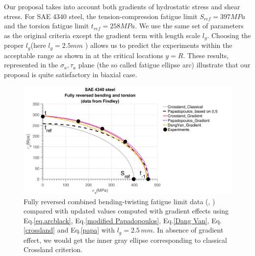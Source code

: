 Our proposal takes into account both gradients of hydrostatic stress and shear stress. For SAE 4340 steel, the tension-compression fatigue limit $S_{ref}=397MPa$ and the torsion fatigue limit $t_{ref}=258MPa$. We use the same set of parameters as the original criteria except the gradient term with length scale $l_g$. Choosing the proper $l_g$(here $l_g=2.5mm$ ) allows us to predict the experiments within the acceptable range as shown in  at the critical locations $y=R$. These results, represented in the $\sigma_a, \tau_a$ plane (the so called fatigue ellipse arc)  illustrate that our proposal is quite satisfactory in biaxial case.	

\begin{figure}[!h]
	\includegraphics[width=\textwidth]{figures//4340.png}
	\caption{Fully reversed combined bending-twisting fatigue limit data (\cite{findley1956theory}, \cite{Papadopoulos1996513}) compared with updated values computed with gradient effects using 	Eq.\ref{eq.arcblack}, Eq.\ref{modified Papadopoulos}, Eq.\ref{Dang Van}, Eq.\ref{crossland} and Eq.\ref{papa} with $l_g = 2.5 \, mm$. In absence of gradient effect, we would get the inner gray ellipse corresponding to classical Crossland criterion.}
	\label{4340}
\end{figure}



\newpage
